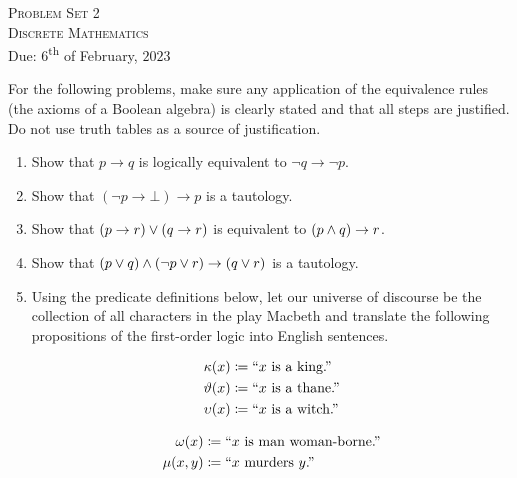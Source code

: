 




\begin{center}
    \textsc{\huge Problem Set 2}\\
    \textsc{\large Discrete Mathematics}\\
    {\color{gruvred}Due: \(6\)\textsuperscript{th} of February, \(2023\)}
\end{center}

For the following problems, make sure any application of the equivalence rules
(the axioms of a Boolean algebra) is clearly stated and that all steps are justified.
Do not use truth tables as a source of justification.
\begin{enumerate}
    \item
        Show that \(p \rightarrow q\) is logically equivalent to \(\neg q \rightarrow \neg p\).
    \item
        Show that \((\neg p \rightarrow \bot)  \rightarrow p\) is a tautology.
    \item
        Show that \((p \rightarrow r) \vee (q \rightarrow r)\) is equivalent to \((p \wedge q) \rightarrow r\).
    \item
        Show that \((p \vee q) \wedge (\neg p \vee r) \rightarrow (q \vee r)\) is a tautology.
    \item
        Using the predicate definitions below,
        let our universe of discourse be the collection of all characters in the play Macbeth
        and translate the following propositions of the first-order logic into English sentences.\\
        \begin{minipage}{.5\linewidth}
            \begin{align*}
                \kappa(x) &\coloneqq \text{``}x\text{ is a king.''}\\
                \vartheta(x) &\coloneqq \text{``}x\text{ is a thane.''}\\
                \upsilon(x) &\coloneqq \text{``}x\text{ is a witch.''}
            \end{align*}
        \end{minipage}%
        \begin{minipage}{.5\linewidth}
            \begin{align*}
                \omega(x) &\coloneqq \text{``}x\text{ is man woman-borne.''}\\
                \mu(x, y) &\coloneqq \text{``}x\text{ murders }y\text{.''}
            \end{align*}

\end{minipage}
\end{enumerate}
